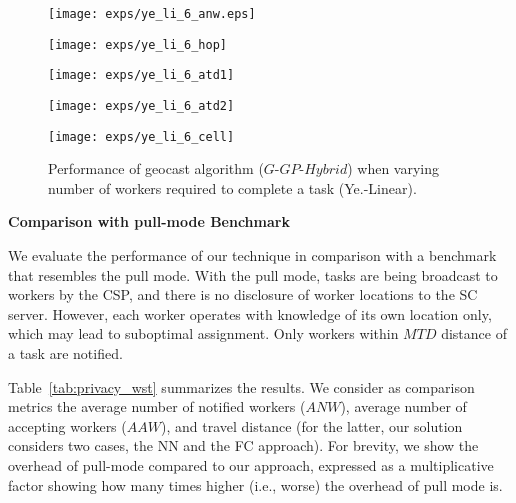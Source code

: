 \documentclass{USC-Thesis}
\numberwithin{equation}{chapter}
\begin{document}
\begin{figure*}[tbh]
	\begin{minipage}[b]{0.195\linewidth}
	\centering
		\texttt{[image: exps/ye\_li\_6\_anw.eps]}
		\label{fig:ye_li_6_anw}
	\end{minipage}
	\begin{minipage}[b]{0.195\linewidth}
	\centering
		\texttt{[image: exps/ye\_li\_6\_hop]}
		\label{fig:ye_li_6_hop}
	\end{minipage}
	\begin{minipage}[b]{0.195\linewidth}
	\centering
		\texttt{[image: exps/ye\_li\_6\_atd1]}
		\label{fig:ye_li_6_atd1}
	\end{minipage}	
	\begin{minipage}[b]{0.195\linewidth}
	\centering
		\texttt{[image: exps/ye\_li\_6\_atd2]}
		\label{fig:ye_li_6_atd2}
	\end{minipage}
	\begin{minipage}[b]{0.195\linewidth}
		\centering
		\texttt{[image: exps/ye\_li\_6\_cell]}
		\label{fig:ye_li_6_cell}
	\end{minipage}
	\caption{Performance of geocast algorithm ($G$-$\mathit{GP}$-$\mathit{Hybrid}$) when varying number of workers required to complete a task (Ye.-Linear).}
\label{fig:varying_k}
\end{figure*}

\textbf{Comparison with pull-mode Benchmark}

We evaluate the performance of our technique in comparison with a benchmark that resembles the pull mode. With the pull mode, tasks are being broadcast to workers by the CSP, and there is no disclosure of worker locations to the SC server. However, each worker operates with knowledge of its own location only, which may lead to suboptimal assignment. Only workers within $MTD$ distance of a task are notified.

Table~\ref{tab:privacy_wst} summarizes the results. We consider as comparison metrics the average number of notified workers ($\mathit{ANW}$), average number of accepting workers ($AAW$), and travel distance (for the latter, our solution considers two cases, the NN and the FC approach). For brevity, we show the overhead of pull-mode compared to our approach, expressed as a multiplicative factor showing how many times higher (i.e., worse) the overhead of pull mode is.
\end{document}
